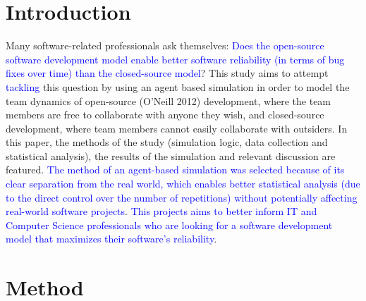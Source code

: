 \documentclass[10pt, a4paper, fleqn]{article}
\begin{document}
\section{Introduction}
Many software-related professionals ask themselves: \textcolor{blue}{Does the open-source software development model enable better software reliability (in terms of bug fixes over time) than the closed-source model}? This study aims to attempt \textcolor{blue}{tackling} this question by using an agent based simulation in order to model the team dynamics of open-source (O’Neill 2012) development, where the team members are free to collaborate with anyone they wish, and closed-source development, where team members cannot easily collaborate with outsiders. In this paper, the methods of the study (simulation logic, data collection and statistical analysis), the results of the simulation and relevant discussion are featured. \textcolor{blue}{The method of an agent-based simulation was selected because of its clear separation from the real world, which enables better statistical analysis (due to the direct control over the number of repetitions) without potentially affecting real-world software projects}. \textcolor{blue}{This projects aims to better inform IT and Computer Science professionals who are looking for a software development model that maximizes their software's reliability}.
\section{Method}
\end{document}

